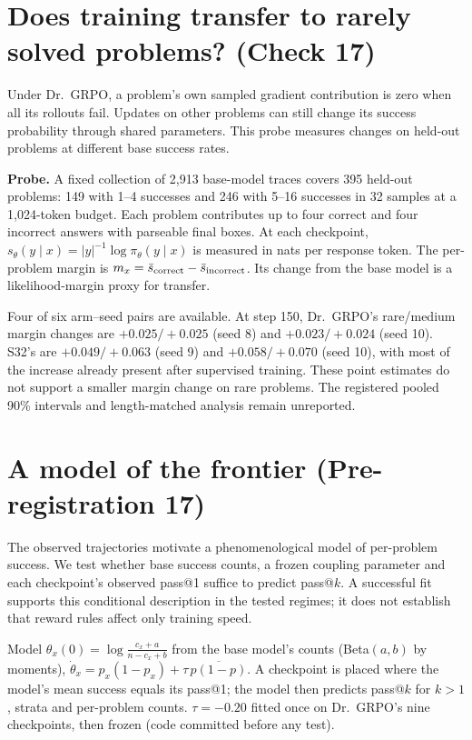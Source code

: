 \documentclass[11pt]{article}
\begin{document}
\section{Does training transfer to rarely solved problems? (Check 17)}
\begin{why}
Under Dr.\ GRPO, a problem's own sampled gradient contribution is zero when all its rollouts fail. Updates on other problems can still change its success probability through shared parameters. This probe measures changes on held-out problems at different base success rates.
\end{why}
\textbf{Probe.} A fixed collection of 2,913 base-model traces covers 395 held-out problems: 149 with 1--4 successes and 246 with 5--16 successes in 32 samples at a 1,024-token budget. Each problem contributes up to four correct and four incorrect answers with parseable final boxes. At each checkpoint, $s_\theta(y\mid x)=|y|^{-1}\log\pi_\theta(y\mid x)$ is measured in nats per response token. The per-problem margin is $m_x=\bar s_{\rm correct}-\bar s_{\rm incorrect}$. Its change from the base model is a likelihood-margin proxy for transfer.
\begin{found}
Four of six arm--seed pairs are available. At step 150, Dr.\ GRPO's rare/medium margin changes are $+0.025/+0.025$ (seed 8) and $+0.023/+0.024$ (seed 10). S32's are $+0.049/+0.063$ (seed 9) and $+0.058/+0.070$ (seed 10), with most of the increase already present after supervised training. These point estimates do not support a smaller margin change on rare problems. The registered pooled 90\% intervals and length-matched analysis remain unreported.
\end{found}

\section{A model of the frontier (Pre-registration 17)}\label{sec:p17}
\begin{why}
The observed trajectories motivate a phenomenological model of per-problem success. We test whether base success counts, a frozen coupling parameter and each checkpoint's observed pass@1 suffice to predict pass@$k$. A successful fit supports this conditional description in the tested regimes; it does not establish that reward rules affect only training speed.
\end{why}
\begin{idea}{Model}
$\theta_x(0)=\log\frac{c_x+a}{n-c_x+b}$ from the base model's counts (Beta$(a,b)$ by moments), $\dot\theta_x=p_x(1-p_x)+\tau\,\overline{p(1-p)}$. A checkpoint is placed where the model's mean success equals its pass@1; the model then predicts pass@$k$ for $k>1$, strata and per-problem counts. $\tau=-0.20$ fitted once on Dr.\ GRPO's nine checkpoints, then frozen (code committed before any test).
\end{idea}
\end{document}
